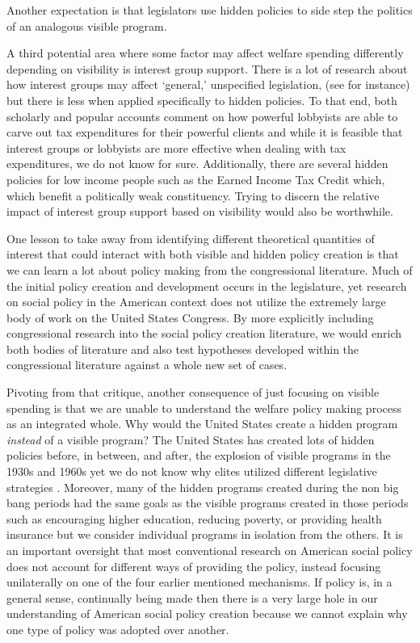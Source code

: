 \documentclass[12pt]{article}
\begin{document}
Another expectation is that legislators use hidden policies to side step the politics of an analogous visible program.

A third potential area where some factor may affect welfare spending differently depending on visibility is interest group support. There is a lot of research about how interest groups may affect `general,' unspecified legislation, (see \citealt{hall2006} for instance) but there is less when applied specifically to hidden policies. To that end, both scholarly and popular accounts comment on how powerful lobbyists are able to carve out tax expenditures for their  powerful clients \citep{hacker2011, leibovich2013} and while it is feasible that interest groups or lobbyists are more effective when dealing with tax expenditures, we do not know for sure. Additionally, there are several hidden policies for low income people such as the Earned Income Tax Credit which, which benefit a politically weak constituency. Trying to discern the relative impact of interest group support based on visibility would also be worthwhile.

One lesson to take away from identifying different theoretical quantities of interest that could interact with both visible and hidden policy creation is that we can learn a lot about policy making from the congressional literature. Much of the initial policy creation and development occurs in the legislature, yet research on social policy in the American context does not utilize the extremely large body of work on the United States Congress. By more explicitly including congressional research into the social policy creation literature, we would enrich both bodies of literature and also test hypotheses developed within the congressional literature against a whole new set of cases.

Pivoting from that critique, another consequence of just focusing on visible spending is that we are unable to understand the welfare policy making process as an integrated whole. Why would the United States create a hidden program \emph{instead} of a visible program? The United States has created lots of hidden policies before, in between, and after, the explosion of visible programs in the 1930s and 1960s yet we do not know why elites utilized different legislative strategies \citep[Ch. 2]{howard2008}. Moreover, many of the hidden programs created during the non big bang periods had the same goals as the visible programs created in those periods such as encouraging higher education, reducing poverty, or providing health insurance but we consider individual programs in isolation from the others. It is an important oversight that most conventional research on American social policy does not account for different ways of providing the policy, instead focusing unilaterally on one of the four earlier mentioned mechanisms. If policy is, in a general sense, continually being made then there is a very large hole in our understanding of American social policy creation because we cannot explain why one type of policy was adopted over another.
\end{document}
